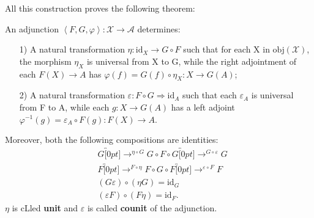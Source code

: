\documentclass[../category_theory.tex]{subfiles}
\begin{document}
All this construction proves the following theorem:
\begin{theorem*}
	An adjunction \(\left< F, G, \varphi  \right>:\mathcal{X}\rightarrow \mathcal{A}\) determines:
	\begin{itemize}
		\item[1)] A natural transformation \(\eta :\mathrm{id}_{X}\rightarrow G\circ F\) such that for each X in \(\mathrm{obj}(\mathcal{X})\), the morphism \(\eta_{X}\) is universal from X to G, while the right adjointment of each \(F(X)\rightarrow A\) has \(\varphi (f)=G(f)\circ \eta_{X}:X\rightarrow G(A)\);
		\item[2)] A natural transformation \(\varepsilon :F\circ G\Rightarrow \mathrm{id}_{A}\) such that each \(\varepsilon_{A}\) is universal from F to A, while each \(g:X\rightarrow G(A)\) has a left adjoint \(\varphi^{-1}(g)=\varepsilon_{A}\circ F(g):F(X)\rightarrow A\).
	\end{itemize}
	Moreover, both the following compositions are identities:
	\begin{align*}
		 & G\overbracket[0pt]{\longrightarrow}^{\eta \circ G}G\circ F\circ G\overbracket[0pt]{\longrightarrow}^{G\circ \varepsilon  }G \\
		 & F\overbracket[0pt]{\longrightarrow}^{F\circ \eta }F\circ G\circ F\overbracket[0pt]{\longrightarrow}^{\varepsilon \circ F }F \\
		 & (G\varepsilon )\circ (\eta G)=\mathrm{id}_{G}                                                                               \\
		 & (\varepsilon F)\circ (F\eta )=\mathrm{id}_{F}.
	\end{align*}
	\(\eta \) is cLled \textbf{unit} and \(\varepsilon \) is called \textbf{counit} of the adjunction.
\end{theorem*}
\end{document}
